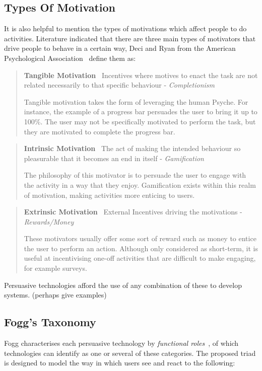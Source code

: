 \subsection{Types Of Motivation}
It is also helpful to mention the types of motivations which affect people to do activities. Literature indicated that there are three main types of motivators that drive people to behave in a certain way, Deci and Ryan from the American Psychological Association~\cite{motivationtypes} define them as:
\begin{quotation}
\noindent
\textbf{Tangible Motivation}~ Incentives where motives to enact the task are not related necessarily to that specific behaviour - \textit{Completionism}

Tangible motivation takes the form of leveraging the human Psyche. For instance, the example of a progress bar persuades the user to bring it up to 100\%. The user may not be specifically motivated to perform the task, but they are motivated to complete the progress bar.
\end{quotation}
\begin{quotation}
\noindent
\textbf{Intrinsic Motivation}~ The act of making the intended behaviour so pleasurable that it becomes an end in itself - \textit{Gamification}

The philosophy of this motivator is to persuade the user to engage with the activity in a way that they enjoy. Gamification exists within this realm of motivation, making activities more enticing to users.
\end{quotation}
\begin{quotation}
\noindent
\textbf{Extrinsic Motivation}~ External Incentives driving the motivations - \textit{Rewards/Money}

These motivators usually offer some sort of reward such as money to entice the user to perform an action. Although only considered as short-term, it is useful at incentivising one-off activities that are difficult to make engaging, for example surveys. 
\end{quotation}

Persuasive technologies afford the use of any combination of these to develop systems. (perhaps give examples)

\subsection{Fogg's Taxonomy}
Fogg characterises each persuasive technology by \emph{functional roles}~\cite{fogg1998persuasive}, of which technologies can identify as one or several of these categories. The proposed triad is designed to model the way in which users see and react to the following:

